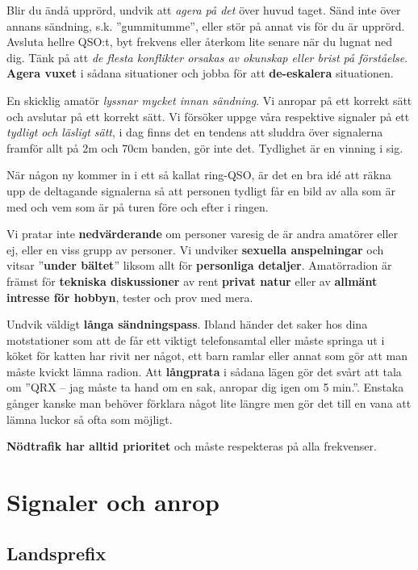 Blir du ändå upprörd, undvik att \emph{agera på det} över huvud taget. Sänd
inte över annans sändning, s.k. ''gummitumme'', eller stör på annat vis för du
är upprörd. Avsluta hellre QSO:t, byt frekvens eller återkom lite senare när
du lugnat ned dig. Tänk på att \textit{de flesta konflikter orsakas av
okunskap eller brist på förståelse}. \textbf{Agera vuxet} i sådana situationer
och jobba för att \textbf{de-eskalera} situationen.

En skicklig amatör \textit{lyssnar mycket innan sändning}. Vi anropar på ett
korrekt sätt och avslutar på ett korrekt sätt. Vi försöker uppge våra
respektive signaler på ett \emph{tydligt och läsligt sätt}, i dag finns det en
tendens att sluddra över signalerna framför allt på 2m och 70cm banden, gör
inte det. Tydlighet är en vinning i sig.

När någon ny kommer in i ett så kallat ring-QSO, är det en bra idé att räkna
upp de deltagande signalerna så att personen tydligt får en bild av alla som
är med och vem som är på turen före och efter i ringen.

Vi pratar inte \textbf{nedvärderande} om personer varesig de är andra amatörer
eller ej, eller en viss grupp av personer. Vi undviker \textbf{sexuella
anspelningar} och vitsar ''\textbf{under bältet}'' liksom allt för
\textbf{personliga detaljer}. Amatörradion är främst för \textbf{tekniska
diskussioner} av rent \textbf{privat natur} eller av \textbf{allmänt intresse
för hobbyn}, tester och prov med mera.

Undvik väldigt \textbf{långa sändningspass}. Ibland händer det saker hos dina
motstationer som att de får ett viktigt telefonsamtal eller måste springa ut i
köket för katten har rivit ner något, ett barn ramlar eller annat som gör att
man måste kvickt lämna radion. Att \textbf{långprata} i sådana lägen gör det
svårt att tala om ''QRX -- jag måste ta hand om en sak, anropar dig igen om 5
min.''. Enstaka gånger kanske man behöver förklara något lite längre men gör
det till en vana att lämna luckor så ofta som möjligt.

\textbf{Nödtrafik har alltid prioritet} och måste respekteras på alla
frekvenser.

\clearpage

\section{Signaler och anrop}

\subsection{Landsprefix}

